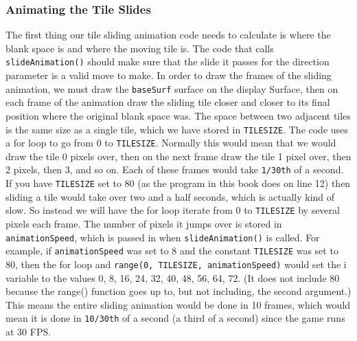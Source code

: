 \subsubsection{Animating the Tile Slides}
The first thing our tile sliding animation code needs to calculate is where the blank space is and where the moving tile is. The code that calls \texttt{slideAnimation()} should make sure that the slide it passes for the direction parameter is a valid move to make.
In order to draw the frames of the sliding animation, we must draw the \texttt{baseSurf} surface on the display Surface, then on each frame of the animation draw the sliding tile closer and closer to its final position where the original blank space was. The space between two adjacent tiles is the same size as a single tile, which we have stored in \texttt{TILESIZE}. The code uses a for loop to go from 0 to \texttt{TILESIZE}.
Normally this would mean that we would draw the tile 0 pixels over, then on the next frame draw the tile 1 pixel over, then 2 pixels, then 3, and so on. Each of these frames would take \texttt{1/30th} of a second. If you have \texttt{TILESIZE} set to 80 (as the program in this book does on line 12) then sliding a tile would take over two and a half seconds, which is actually kind of slow.
So instead we will have the for loop iterate from 0 to \texttt{TILESIZE} by several pixels each frame. The number of pixels it jumps over is stored in \texttt{animationSpeed}, which is passed in when \texttt{slideAnimation()} is called. For example, if \texttt{animationSpeed} was set to 8 and the constant \texttt{TILESIZE} was set to 80, then the for loop and \texttt{range(0, TILESIZE, animationSpeed)} would set the i variable to the values 0, 8, 16, 24, 32, 40, 48, 56, 64, 72. (It does not include 80 because the range() function goes up to, but not including, the second argument.) This means the entire sliding animation would be done in 10 frames, which would mean it is done in \texttt{10/30th} of a second (a third of a second) since the game runs at 30 FPS.
